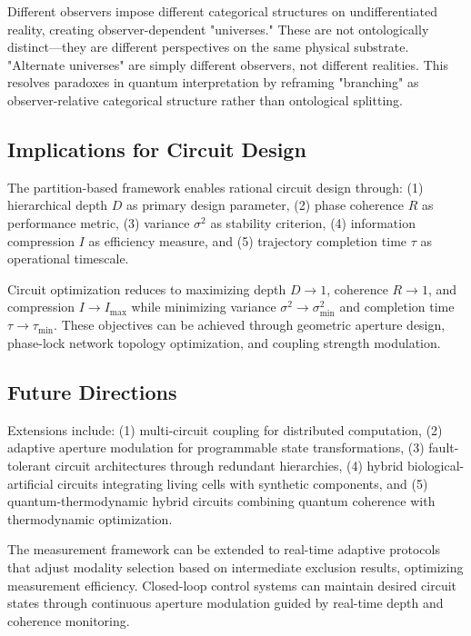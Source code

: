 \documentclass[12pt,a4paper]{article}
\theoremstyle{plain}
\theoremstyle{definition}
\theoremstyle{remark}
\begin{document}
Different observers impose different categorical structures on undifferentiated reality, creating observer-dependent "universes." These are not ontologically distinct—they are different perspectives on the same physical substrate. "Alternate universes" are simply different observers, not different realities. This resolves paradoxes in quantum interpretation by reframing "branching" as observer-relative categorical structure rather than ontological splitting.

\subsection{Implications for Circuit Design}

The partition-based framework enables rational circuit design through: (1) hierarchical depth $D$ as primary design parameter, (2) phase coherence $R$ as performance metric, (3) variance $\sigma^2$ as stability criterion, (4) information compression $I$ as efficiency measure, and (5) trajectory completion time $\tau$ as operational timescale.

Circuit optimization reduces to maximizing depth $D \to 1$, coherence $R \to 1$, and compression $I \to I_{\max}$ while minimizing variance $\sigma^2 \to \sigma^2_{\min}$ and completion time $\tau \to \tau_{\min}$. These objectives can be achieved through geometric aperture design, phase-lock network topology optimization, and coupling strength modulation.

\subsection{Future Directions}

Extensions include: (1) multi-circuit coupling for distributed computation, (2) adaptive aperture modulation for programmable state transformations, (3) fault-tolerant circuit architectures through redundant hierarchies, (4) hybrid biological-artificial circuits integrating living cells with synthetic components, and (5) quantum-thermodynamic hybrid circuits combining quantum coherence with thermodynamic optimization.

The measurement framework can be extended to real-time adaptive protocols that adjust modality selection based on intermediate exclusion results, optimizing measurement efficiency. Closed-loop control systems can maintain desired circuit states through continuous aperture modulation guided by real-time depth and coherence monitoring.
\end{document}
